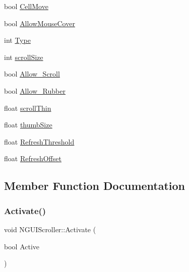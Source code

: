 \begin{DoxyCompactItemize}
\item 
bool \hyperlink{class_n_g_u_i_scroller_a7932371668636ba798512ba121695ef2}{Cell\+Move}
\item 
bool \hyperlink{class_n_g_u_i_scroller_a9ef23d653e26bbf43b13796e99969694}{Allow\+Mouse\+Cover}
\item 
int \hyperlink{class_n_g_u_i_scroller_acfc87f2dfb66e1e48bfb0893abf75348}{Type}
\item 
int \hyperlink{class_n_g_u_i_scroller_ac2910a92a4dac3869ea8fd3da1be2ac0}{scroll\+Size}
\item 
bool \hyperlink{class_n_g_u_i_scroller_a0e4a71a83d0c030aea59b9a39489a51b}{Allow\+\_\+\+Scroll}
\item 
bool \hyperlink{class_n_g_u_i_scroller_abbd33a9deed30864c9808088cb364156}{Allow\+\_\+\+Rubber}
\item 
float \hyperlink{class_n_g_u_i_scroller_aed15fdb77b0c007ecc43c3bab0ddf94c}{scroll\+Thin}
\item 
float \hyperlink{class_n_g_u_i_scroller_a0e421d6b9d638d1fc487500a1523740e}{thumb\+Size}
\item 
float \hyperlink{class_n_g_u_i_scroller_a9243784c26fa85e9a05c6841c57dcdff}{Refresh\+Threshold}
\item 
float \hyperlink{class_n_g_u_i_scroller_aa0a7b66d3f63628d020d2fe4e647ce0a}{Refresh\+Offset}
\end{DoxyCompactItemize}


\subsection{Member Function Documentation}
\hypertarget{class_n_g_u_i_scroller_a2b8d34f2f68d7d0f85098fd85a83d444}{}\label{class_n_g_u_i_scroller_a2b8d34f2f68d7d0f85098fd85a83d444} 
\subsubsection{\texorpdfstring{Activate()}{Activate()}}
{\footnotesize\ttfamily void N\+G\+U\+I\+Scroller\+::\+Activate (\begin{DoxyParamCaption}\item[{bool}]{Active }\end{DoxyParamCaption})}

\hypertarget{class_n_g_u_i_scroller_ac69850fe8c9383b5e193a05efad9f03b}{}\label{class_n_g_u_i_scroller_ac69850fe8c9383b5e193a05efad9f03b} 
